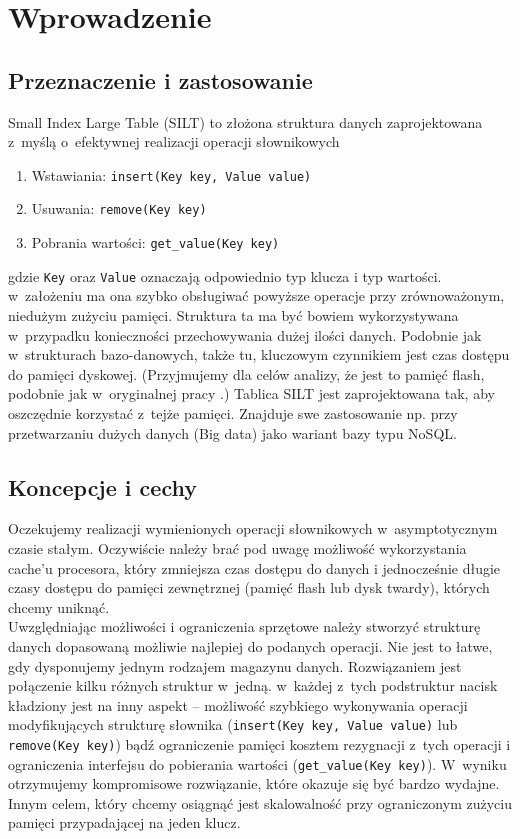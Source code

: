 \documentclass[declaration,shortabstract,masc]{iithesis}
\author{Paweł Guzewicz}
\begin{document}
	\chapter{Wprowadzenie}
		\section{Przeznaczenie i zastosowanie}
			Small Index Large Table (SILT) to złożona struktura danych zaprojektowana z~myślą o~efektywnej realizacji operacji słownikowych
			\begin{enumerate}
				\item
					Wstawiania: \texttt{insert(Key key, Value value)}
				\item
					Usuwania: \texttt{remove(Key key)}
				\item
					Pobrania wartości: \texttt{get\_value(Key key)}
			\end{enumerate}
			gdzie \texttt{Key} oraz \texttt{Value} oznaczają odpowiednio typ klucza i typ wartości.\\
			\indent w~założeniu ma ona szybko obsługiwać powyższe operacje przy zrównoważonym, niedużym zużyciu pamięci. Struktura ta ma być bowiem wykorzystywana w~przypadku konieczności przechowywania dużej ilości danych. Podobnie jak w~strukturach bazo-danowych, także tu, kluczowym czynnikiem jest czas dostępu do pamięci dyskowej. (Przyjmujemy dla celów analizy, że jest to pamięć flash, podobnie jak w~oryginalnej pracy \cite{SILT}.) Tablica SILT jest zaprojektowana tak, aby oszczędnie korzystać z~tejże pamięci. Znajduje swe zastosowanie np. przy przetwarzaniu dużych danych (Big data) jako wariant bazy typu NoSQL.
		\section{Koncepcje i cechy}
			Oczekujemy realizacji wymienionych operacji słownikowych w~asymptotycznym czasie stałym. Oczywiście należy brać pod uwagę możliwość wykorzystania cache'u procesora, który zmniejsza czas dostępu do danych i jednocześnie długie czasy dostępu do pamięci zewnętrznej (pamięć flash lub dysk twardy), których chcemy uniknąć.\\
			\indent Uwzględniając możliwości i ograniczenia sprzętowe należy stworzyć strukturę danych dopasowaną możliwie najlepiej do podanych operacji. Nie jest to łatwe, gdy dysponujemy jednym rodzajem magazynu danych. Rozwiązaniem jest połączenie kilku różnych struktur w~jedną. w~każdej z~tych podstruktur nacisk kładziony jest na inny aspekt -- możliwość szybkiego wykonywania operacji modyfikujących strukturę słownika (\texttt{insert(Key key, Value value)} lub \texttt{remove(Key key)}) bądź ograniczenie pamięci kosztem rezygnacji z~tych operacji i ograniczenia interfejsu do pobierania wartości (\texttt{get\_value(Key key)}). W~wyniku otrzymujemy kompromisowe rozwiązanie, które okazuje się być bardzo wydajne.\\
			\indent Innym celem, który chcemy osiągnąć jest skalowalność przy ograniczonym zużyciu pamięci przypadającej na jeden klucz.
\end{document}

